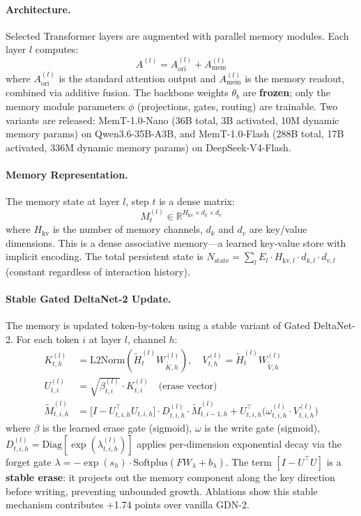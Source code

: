 \documentclass[11pt,a4paper]{article}
\begin{document}
\paragraph{Architecture.}
Selected Transformer layers are augmented with parallel memory modules. Each layer $l$ computes:
\begin{equation}
A^{(l)} = A^{(l)}_{\text{ori}} + A^{(l)}_{\text{mem}}
\end{equation}
where $A^{(l)}_{\text{ori}}$ is the standard attention output and $A^{(l)}_{\text{mem}}$ is the memory readout, combined via additive fusion. The backbone weights $\theta_b$ are \textbf{frozen}; only the memory module parameters $\phi$ (projections, gates, routing) are trainable. Two variants are released: MemT-1.0-Nano (36B total, 3B activated, 10M dynamic memory params) on Qwen3.6-35B-A3B, and MemT-1.0-Flash (288B total, 17B activated, 336M dynamic memory params) on DeepSeek-V4-Flash.

\paragraph{Memory Representation.}
The memory state at layer $l$, step $t$ is a dense matrix:
\begin{equation}
M^{(l)}_t \in \mathbb{R}^{H_{\text{kv}} \times d_k \times d_v}
\end{equation}
where $H_{\text{kv}}$ is the number of memory channels, $d_k$ and $d_v$ are key/value dimensions. This is a dense associative memory---a learned key-value store with implicit encoding. The total persistent state is $N_{\text{state}} = \sum_l E_l \cdot H_{\text{kv},l} \cdot d_{k,l} \cdot d_{v,l}$ (constant regardless of interaction history).

\paragraph{Stable Gated DeltaNet-2 Update.}
The memory is updated token-by-token using a stable variant of Gated DeltaNet-2. For each token $i$ at layer $l$, channel $h$:
\begin{align}
K^{(l)}_{t,h} &= \text{L2Norm}(\tilde{H}^{(l)}_t W_{\tilde{K},h}^{(l)}), \quad V^{(l)}_{t,h} = \tilde{H}^{(l)}_t W_{\tilde{V},h}^{(l)} \\
U^{(l)}_{t,i} &= \sqrt{\beta^{(l)}_{t,i}} \cdot K^{(l)}_{t,i} \quad \text{(erase vector)} \\
\tilde{M}^{(l)}_{t,i,h} &= \bigl[I - U_{t,i,h}^\top U_{t,i,h}\bigr] \cdot D^{(l)}_{t,i,h} \cdot \tilde{M}^{(l)}_{t,i-1,h} + U_{t,i,h}^\top \bigl(\omega^{(l)}_{t,i,h} \cdot V^{(l)}_{t,i,h}\bigr)
\end{align}
where $\beta$ is the learned erase gate (sigmoid), $\omega$ is the write gate (sigmoid), $D^{(l)}_{t,i,h} = \text{Diag}[\exp(\lambda^{(l)}_{t,i,h})]$ applies per-dimension exponential decay via the forget gate $\lambda = -\exp(s_h) \cdot \text{Softplus}(FW_\lambda + b_\lambda)$. The term $[I - U^\top U]$ is a \textbf{stable erase}: it projects out the memory component along the key direction before writing, preventing unbounded growth. Ablations show this stable mechanism contributes $+$1.74 points over vanilla GDN-2.
\end{document}

